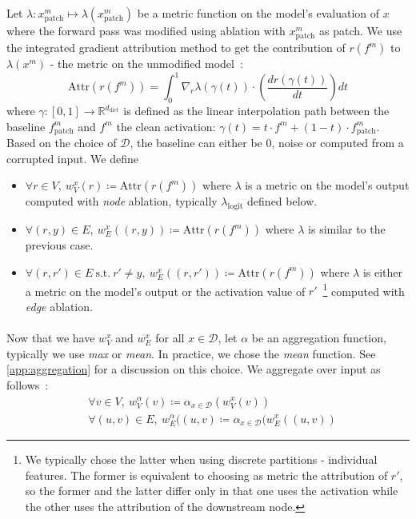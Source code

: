 \documentclass{article}
\newcommand{\R}{\mathbb{R}}
\begin{document}
Let $\lambda : x_{\mathrm{patch}}^m \mapsto \lambda(x_{\mathrm{patch}}^m)$ be a metric function on the model's evaluation of $x$ where the forward pass was modified using ablation with $x_{\mathrm{patch}}^m$ as patch. We use the integrated gradient attribution method to get the contribution of $r(f^m)$ to $\lambda(x^m)$ - the metric on the unmodified model~:
$$\mathrm{Attr}(r(f^m)) = \int_{0}^{1} \nabla_{r} \lambda(\gamma(t)) \cdot \left(\frac{d r(\gamma(t))}{d t}\right) dt $$
where $\gamma : [0, 1] \rightarrow \R^{d_{\mathrm{dict}}}$ is defined as the linear interpolation path between the baseline $f_{\mathrm{patch}}^m$ and $f^m$ the clean activation: $\gamma(t) =  t \cdot f^m + (1-t) \cdot f_{\mathrm{patch}}^m$. Based on the choice of $\mathcal{D}$, the baseline can either be $0$, noise or computed from a corrupted input. We define
\begin{itemize}
    \item $\forall r \in V,~w_V^x(r) \coloneq \mathrm{Attr}(r(f^m))$ where $\lambda$ is a metric on the model's output computed with \emph{node} ablation, typically $\lambda_{\mathrm{logit}}$ defined below.
    \item $\forall (r, y) \in E,~w_E^x((r, y)) \coloneq \mathrm{Attr}(r(f^m))$ where $\lambda$ is similar to the previous case.
    \item $\forall (r, r') \in E~\mathrm{s.t.}~r' \ne y,~w_E^x((r, r')) \coloneq \mathrm{Attr}(r(f^m))$ where $\lambda$ is either a metric on the model's output or the activation value of $r'$~\footnote{We typically chose the latter when using discrete partitions - individual features. The former is equivalent to choosing as metric the attribution of $r'$, so the former and the latter differ only in that one uses the activation while the other uses the attribution of the downstream node.} computed with \emph{edge} ablation.
\end{itemize}

\paragraph{}Now that we have $w_V^x$ and $w_E^x$ for all $x \in \mathcal{D}$, let $\alpha$ be an aggregation function, typically we use \emph{max} or \emph{mean}. In practice, we chose the \emph{mean} function. See \cref{app:aggregation} for a discussion on this choice. We aggregate over input as follows~:
\begin{align*}
    &\forall v \in V,~w_V^\alpha(v) \coloneq \alpha_{x \in \mathcal{D}}(w_V^x(v))\\
    &\forall (u, v) \in E,~w_E^\alpha((u, v) \coloneq \alpha_{x \in \mathcal{D}}(w_E^x((u, v))
\end{align*}
\end{document}
